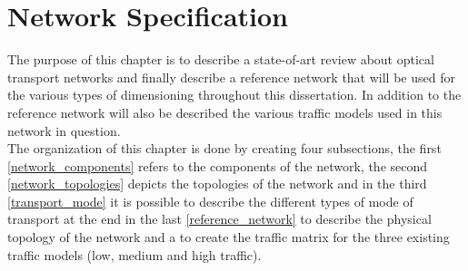 
\chapter{Network Specification}
\label{chap_reference_network}
The purpose of this chapter is to describe a state-of-art review about optical transport networks and finally describe a reference network that will be used for the various types of dimensioning throughout this dissertation. In addition to the reference network will also be described the various traffic models used in this network in question.\\
The organization of this chapter is done by creating four subsections, the first \ref{network_components} refers to the components of the network, the second \ref{network_topologies} depicts the topologies of the network and in the third \ref{transport_mode} it is possible to describe the different types of mode of transport at the end in the last \ref{reference_network} to describe the physical topology of the network and a to create the traffic matrix for the three existing traffic models (low, medium and high traffic).\\


